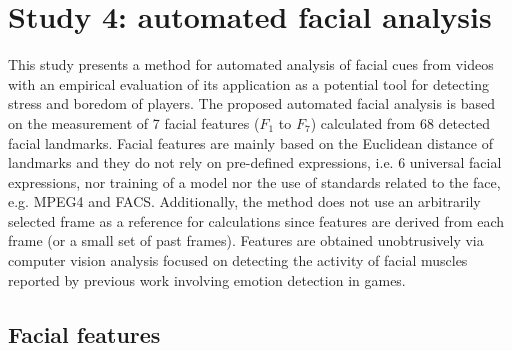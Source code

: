 \section{Study 4: automated facial analysis}
\label{sec:experiment1-study4}

This study presents a method for automated analysis of facial cues from videos with an empirical evaluation of its application as a potential tool for detecting stress and boredom of players. The proposed automated facial analysis is based on the measurement of 7 facial features ($F_1$ to $F_7$) calculated from 68 detected facial landmarks. Facial features are mainly based on the Euclidean distance of landmarks and they do not rely on pre-defined expressions, i.e. 6 universal facial expressions, nor training of a model nor the use of standards related to the face, e.g. MPEG4 and FACS. Additionally, the method does not use an arbitrarily selected frame as a reference for calculations since features are derived from each frame (or a small set of past frames). Features are obtained unobtrusively via computer vision analysis focused on detecting the activity of facial muscles reported by previous work involving emotion detection in games.


\subsection{Facial features}
\label{sec:experiment1-study4-features-extraction}


